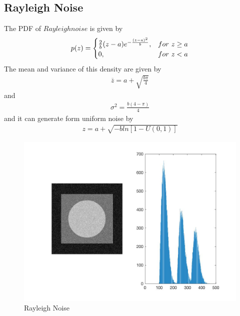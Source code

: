 \documentclass[11pt,oneside]{book}
\begin{document}
\subsection{Rayleigh Noise}
The PDF of $Rayleigh noise$ is given by\\
\begin{eqnarray}p(z)=
\begin{cases}
\frac{2}{b}(z-a)e^{-\frac{(z-a)^2}{b}}, &for\ z \ge a\cr 0, &for\ z <a\end{cases}
\end{eqnarray}
The mean and variance of this density are given by\\
\begin{align}
\overline z = a + \sqrt{\frac{b\pi}{4}}
\end{align}
and
\begin{align}
\sigma ^2 = \frac{b(4-\pi)}{4}
\end{align}
and it can generate form uniform noise by\\
\begin{align}
  z=a+\sqrt{-bln[1-U(0,1)]}
\end{align}
\begin{figure}[!htb]
   \centering  
   \includegraphics[width=1.0\textwidth]{images/4/rayleigh.jpg}
   \caption{Rayleigh Noise}  
\end{figure}
\newpage
\end{document}
